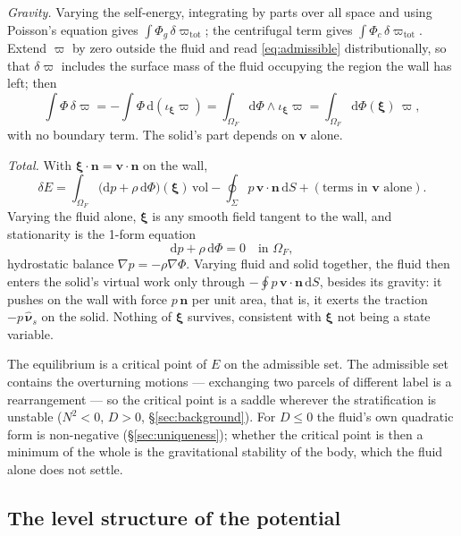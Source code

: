 \documentclass[11pt]{article}
\theoremstyle{definition}
\theoremstyle{remark}
\newcommand{\bv}{\mathbf{v}}
\newcommand{\bn}{\mathbf{n}}
\newcommand{\bxi}{\boldsymbol{\xi}}
\newcommand{\dS}{\,\mathrm{d}S}
\newcommand{\vol}{\mathrm{vol}}
\newcommand{\nuhs}{\hat{\boldsymbol{\nu}}_s}
\begin{document}
\emph{Gravity.} Varying the self-energy, integrating by parts over all
space and using Poisson's equation gives $\int\Phi_g\,\delta
\varpi_{\mathrm{tot}}$; the centrifugal term gives $\int\Phi_c\,\delta
\varpi_{\mathrm{tot}}$. Extend $\varpi$ by zero outside the fluid and
read \eqref{eq:admissible} distributionally, so that $\delta\varpi$
includes the surface mass of the fluid occupying the region the wall
has left; then
\begin{equation*}
  \int\Phi\,\delta\varpi = -\int\Phi\,\mathrm d(\iota_{\bxi}\varpi)
  = \int_{\Omega_F}\mathrm d\Phi\wedge\iota_{\bxi}\varpi
  = \int_{\Omega_F}\mathrm d\Phi(\bxi)\,\varpi ,
\end{equation*}
with no boundary term. The solid's part depends on $\bv$ alone.

\emph{Total.} With $\bxi\cdot\bn = \bv\cdot\bn$ on the wall,
\begin{equation}
  \delta E = \int_{\Omega_F}\bigl(\mathrm dp + \rho\,\mathrm d\Phi\bigr)(\bxi)\,\vol
  - \oint_\Sigma p\,\bv\cdot\bn\dS + (\text{terms in } \bv \text{ alone}) .
  \label{eq:firstvar}
\end{equation}
Varying the fluid alone, $\bxi$ is any smooth field tangent to the
wall, and stationarity is the 1-form equation
\begin{equation}
  \mathrm dp + \rho\,\mathrm d\Phi = 0 \quad\text{in } \Omega_F ,
  \label{eq:hydro1}
\end{equation}
hydrostatic balance $\nabla p = -\rho\nabla\Phi$. Varying fluid and
solid together, the fluid then enters the solid's virtual work only
through $-\oint p\,\bv\cdot\bn\dS$, besides its gravity: it pushes on
the wall with force $p\,\bn$ per unit area, that is, it exerts the
traction $-p\,\nuhs$ on the solid. Nothing of $\bxi$ survives,
consistent with $\bxi$ not being a state variable.

The equilibrium is a critical point of $E$ on the admissible set. The
admissible set contains the overturning motions --- exchanging two
parcels of different label is a rearrangement --- so the critical point
is a saddle wherever the stratification is unstable ($N^2 < 0$,
$D > 0$, \S\ref{sec:background}). For $D \le 0$ the fluid's own
quadratic form is non-negative (\S\ref{sec:uniqueness}); whether the
critical point is then a minimum of the whole is the gravitational
stability of the body, which the fluid alone does not settle.

\subsection{The level structure of the potential}
\label{sec:foliation}
\end{document}
